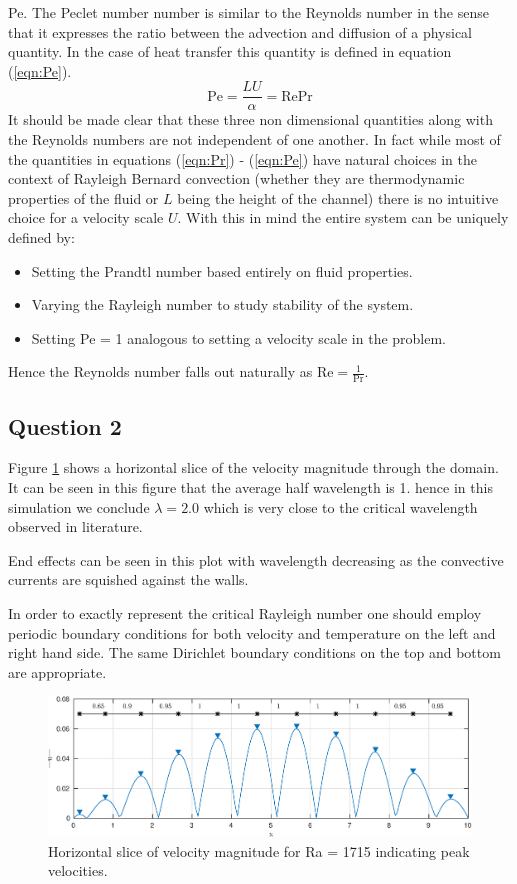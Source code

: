 \documentclass[10pt,a4paper]{article}
\begin{document}
\noindent Pe. The Peclet number number is similar to the Reynolds number in the sense that it expresses the ratio between the advection and diffusion of a physical quantity. In the case of heat transfer this quantity is defined in equation (\ref{eqn:Pe}).
\begin{equation}
\text{Pe} = \frac{LU}{\alpha} = \text{Re} \text{Pr}
\label{eqn:Pe}
\end{equation}
\noindent It should be made clear that these three non dimensional quantities along with the Reynolds numbers are not independent of one another. In fact while most of the quantities in equations (\ref{eqn:Pr}) - (\ref{eqn:Pe}) have natural choices in the context of Rayleigh Bernard convection (whether they are thermodynamic properties of the fluid or $L$ being the height of the channel) there is no intuitive choice for a velocity scale $U$. 
With this in mind the entire system can be uniquely defined by:
\begin{itemize}
\item Setting the Prandtl number based entirely on fluid properties.
\item Varying the Rayleigh number to study stability of the system.
\item Setting Pe = 1 analogous to setting a velocity scale in the problem.
\end{itemize} 
Hence the Reynolds number falls out naturally as $\text{Re} = \frac{1}{\text{Pr}}$.

\subsection{Question 2}

Figure \ref{fig:findpeaks} shows a horizontal slice of the velocity magnitude through the domain. It can be seen in this figure that the average half wavelength is 1. hence in this simulation we conclude $\lambda = 2.0$ which is very close to the critical wavelength observed in literature.

End effects can be seen in this plot with wavelength decreasing as the convective currents are squished against the walls. 

In order to exactly represent the critical Rayleigh number one should employ periodic boundary conditions for both velocity and temperature on the left and right hand side. The same Dirichlet boundary conditions on the top and bottom are appropriate. 


\begin{figure}[H]
\centering
\includegraphics[width=\linewidth]{findpeaks.eps}
\caption{Horizontal slice of velocity magnitude for Ra = 1715 indicating peak velocities.}
\label{fig:findpeaks}
\end{figure}
\end{document}
